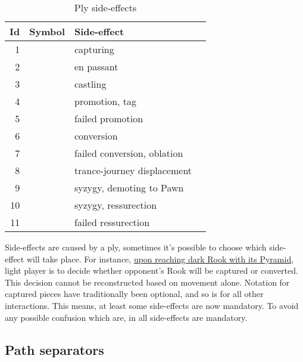 \begin{table}[!h]
\centering
\begin{tabular}{ rlll }
\toprule
\textbf{Id} & \textbf{Symbol}      & \textbf{Side-effect}                   \\
\midrule
1           & \alg{*}              & capturing                              \\
2           & \alg{:}              & en passant                             \\
3           & \alg{\&}             & castling                               \\
4           & \alg{=}              & promotion, tag                         \\
5           & \alg{==}             & failed promotion                       \\
6           & \alg{\%}             & conversion                             \\
7           & \alg{\%\%}           & failed conversion, oblation            \\
8           & \alg{<}              & trance-journey displacement            \\
9           & \alg{>}              & syzygy, demoting to Pawn               \\
10          & \alg{\$}             & syzygy, ressurection                   \\
11          & \alg{\$\$}           & failed ressurection                    \\
\bottomrule
\end{tabular}
\caption{Ply side-effects}
\label{tbl:Appendix/Summary/Ply side-effects}
\end{table}

Side-effects are caused by a ply, sometimes it's possible to choose which side-effect will take place.
For instance,
\hyperref[fig:scn_ma_09_conversion_pyramid_activated]{upon reaching dark Rook with its Pyramid}, light
player is to decide whether opponent's Rook will be captured or converted. This decision cannot be
reconstructed based on movement alone. Notation for captured pieces have traditionally been optional,
and so is for all other interactions. This means, at least some side-effects are now mandatory. To
avoid any possible confusion which are, in  all side-effects are mandatory.

\clearpage %

\subsection*{Path separators}
\label{sec:Appendix/Summary/Path separators}

